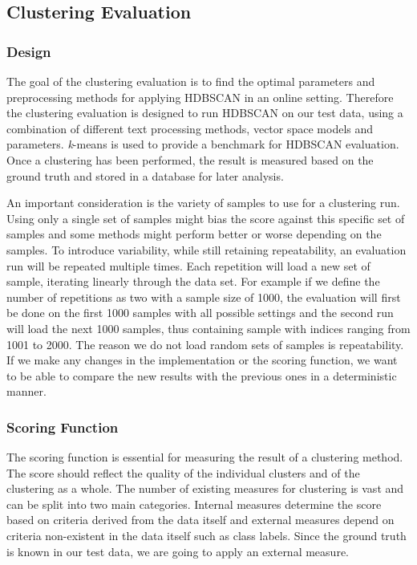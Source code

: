 \subsection{Clustering Evaluation}
\label{subsec:4b_clustering_evaluation}

\subsubsection{Design}
\label{subsubsec:4b_design}

The goal of the clustering evaluation is to find the optimal parameters and preprocessing methods
for applying HDBSCAN in an online setting.
Therefore the clustering evaluation is designed to run HDBSCAN on our test data,
using a combination of different text processing methods, vector space models and parameters.
\textit{k}-means is used to provide a benchmark for HDBSCAN evaluation.
Once a clustering has been performed,
the result is measured based on the ground truth and stored in a database for later analysis.

An important consideration is the variety of samples to use for a clustering run.
Using only a single set of samples might bias the score against this specific set of samples
and some methods might perform better or worse depending on the samples.
To introduce variability, while still retaining repeatability, an evaluation run will be repeated multiple times.
Each repetition will load a new set of sample, iterating linearly through the data set.
For example if we define the number of repetitions as two with a sample size of 1000,
the evaluation will first be done on the first 1000 samples with all possible settings
and the second run will load the next 1000 samples, thus containing sample with indices ranging from 1001 to 2000.
The reason we do not load random sets of samples is repeatability.
If we make any changes in the implementation or the scoring function,
we want to be able to compare the new results with the previous ones in a deterministic manner.

\subsubsection{Scoring Function}
\label{subsubsec:4b_scoring_function}

The scoring function is essential for measuring the result of a clustering method.
The score should reflect the quality of the individual clusters and of the clustering as a whole.
The number of existing measures for clustering is vast and can be split into two main categories.
Internal measures determine the score based on criteria derived from the data itself
and external measures depend on criteria non-existent in the data itself such as class labels.
Since the ground truth is known in our test data, we are going to apply an external measure.

